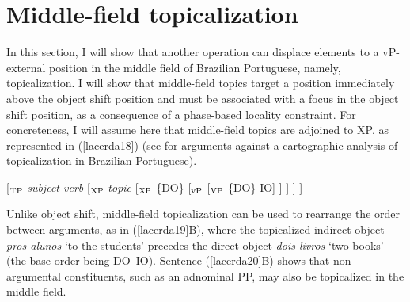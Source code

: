 \documentclass[output=paper]{langscibook}
\begin{document}
\section{Middle-field topicalization}

In this section, I will show that another operation can displace elements to a vP-external position in the middle field of Brazilian Portuguese, namely, topicalization. I will show that middle-field topics target a position immediately above the object shift position and must be associated with a focus in the object shift position, as a consequence of a phase-based locality constraint. For concreteness, I will assume here that middle-field topics are adjoined to XP, as represented in (\ref{lacerda18}) (see \citealt{Lacerda2019,Lacerda2020a,Lacerda2020b} for arguments against a cartographic analysis of topicalization in Brazilian Portuguese).

\begin{exe}
\ex \label{lacerda18}
[$_{\textnormal{TP}}$ \emph{subject verb} [$_{\textnormal{XP}}$ \emph{topic} [$_{\textnormal{XP}}$ \{DO\} [$_{\textnormal{vP}}$ [$_{\textnormal{VP}}$ \{DO\} IO] ] ] ] ]
\end{exe}

Unlike object shift, middle-field topicalization can be used to rearrange the order between arguments, as in (\ref{lacerda19}B), where the topicalized indirect object \emph{pros alunos} ‘to the students’ precedes the direct object \emph{dois livros} ‘two books’ (the base order being DO--IO). Sentence (\ref{lacerda20}B) shows that non-argumental constituents, such as an adnominal PP, may also be topicalized in the middle field.
\end{document}
